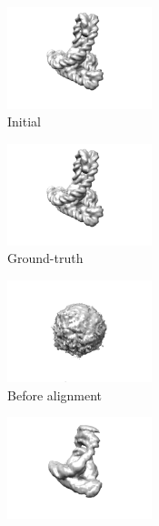\begin{figure}[t]
\begin{subfigure}[b]{0.23\linewidth}
    \end{subfigure}
    \\ \vspace{1em}
    \begin{subfigure}[b]{0.23\linewidth}
        \centering
        \includegraphics[height=8em]{figures/5j0n_fullcvg_noise16_init}
        \caption{Initial}%
        \label{fig:5j0n-noise0-reconstruction-recovered}
    \end{subfigure}
    \hfill
    \begin{subfigure}[b]{0.23\linewidth}
        \centering
        \includegraphics[height=8em]{figures/5j0n_fullcvg_noise16_gt}
        \caption{Ground-truth}%
        \label{fig:5j0n-noise0-reconstruction-true}
    \end{subfigure}
    \hfill
    \begin{subfigure}[b]{0.23\linewidth}
        \centering
        \includegraphics[height=8em]{figures/5j0n_fullcvg_noise16_ap}
        \caption{Before alignment}%
        \label{fig:5j0n-noise16-reconstruction-recovered}
    \end{subfigure}
    \hfill
    \begin{subfigure}[b]{0.23\linewidth}
        \centering
        \includegraphics[height=8em]{figures/5j0n_fullcvg_noise16_apr}

\end{subfigure}
\end{figure}
